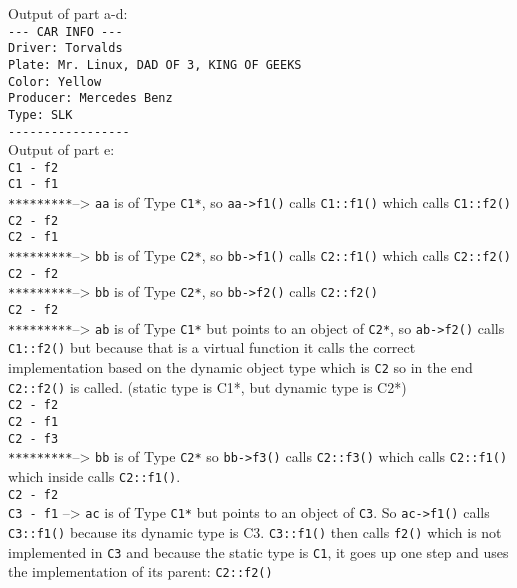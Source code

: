 \documentclass{article} %
\begin{document}
Output of part a-d:\\
\verb|--- CAR INFO ---|\\
\verb|Driver: Torvalds|\\
\verb|Plate: Mr. Linux, DAD OF 3, KING OF GEEKS|\\
\verb|Color: Yellow|\\
\verb|Producer: Mercedes Benz|\\
\verb|Type: SLK|\\
\verb|-----------------|\\

Output of part e:\\
\verb|C1 - f2|\\
\verb|C1 - f1|\\
\verb|*********|\qquad --> \qquad \verb|aa| is of Type \verb|C1*|, so \verb|aa->f1()| calls \verb|C1::f1()| which calls \verb|C1::f2()|\\

\verb|C2 - f2|\\
\verb|C2 - f1|\\
\verb|*********|\qquad --> \qquad \verb|bb| is of Type \verb|C2*|, so \verb|bb->f1()| calls \verb|C2::f1()| which calls \verb|C2::f2()|\\

\verb|C2 - f2|\\
\verb|*********|\qquad --> \qquad \verb|bb| is of Type \verb|C2*|, so \verb|bb->f2()| calls \verb|C2::f2()|\\

\verb|C2 - f2|\\
\verb|*********|\qquad --> \qquad \verb|ab| is of Type \verb|C1*| but points to an object of \verb|C2*|, so \verb|ab->f2()| calls \verb|C1::f2()| but because that is a virtual function it calls the correct implementation based on the dynamic object type which is \verb|C2| so in the end \verb|C2::f2()| is called. (static type is C1*, but dynamic type is C2*)\\

\verb|C2 - f2|\\
\verb|C2 - f1|\\
\verb|C2 - f3|\\
\verb|*********|\qquad --> \qquad \verb|bb| is of Type \verb|C2*| so \verb|bb->f3()| calls \verb|C2::f3()| which calls \verb|C2::f1()| which inside calls \verb|C2::f1()|.\\

\verb|C2 - f2|\\
\verb|C3 - f1|
\qquad --> \qquad \verb|ac| is of Type \verb|C1*| but points to an object of \verb|C3|. So \verb|ac->f1()| calls \verb|C3::f1()| because its dynamic type is C3. \verb|C3::f1()| then calls \verb|f2()| which is not implemented in \verb|C3| and because the static type is \verb|C1|, it goes up one step and uses the implementation of its parent: \verb|C2::f2()|
\end{document}
